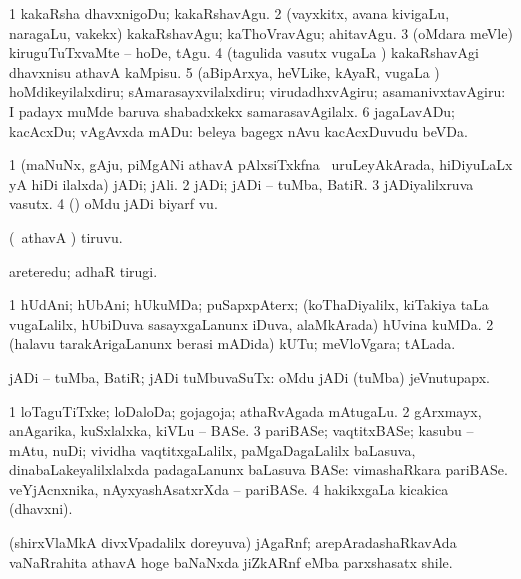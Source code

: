 \noindent
\gl{\akirx}
\bmng
\bnum
\num{1} kakaRsha dhavxnigoDu; kakaRshavAgu. 
\num{2} (vayxkitx, avana kivigaLu, naragaLu, \mo vakekx) kakaRshavAgu; kaThoVravAgu; ahitavAgu. 
\num{3} (oMdara meVle) kiruguTuTxvaMte -- hoDe, tAgu. 
\num{4} (tagulida vasutx \mo vugaLa \vi) kakaRshavAgi dhavxnisu athavA kaMpisu. 
\num{5} (aBipArxya, heVLike, kAyaR, \mo vugaLa \vi) hoMdikeyilalxdiru; sAmarasayxvilalxdiru; virudadhxvAgiru; asamanivxtavAgiru:  I padayx muMde baruva shabadxkekx samarasavAgilalx. 
\num{6} jagaLavADu; kacAcxDu; vAgAvxda mADu:  beleya bagegx nAvu kacAcxDuvudu beVDa. 
\enum
\emng
\eentry

\bentry
{}
\gl{\nA}
\bmng
\bnum
\num{1} (maNuNx, gAju, piMgANi athavA pAlxsiTxkfna \sA\ uruLeyAkArada, hiDiyuLaLx yA hiDi ilalxda) jADi; jAli. 
\num{2} jADi; jADi -- tuMba, BatiR. 
\num{3} jADiyalilxruva vasutx. 
\num{4} (\AmA) oMdu jADi biyarf \mo vu. 
\enum
\emng
\eentry

\bentry
{}
\gl{\nA}
\bmng
(\pArxparx\ athavA \AmA) tiruvu. 
\emng

\noindent
\gl{\pagu}
\bmng
{} areteredu; adhaR tirugi. 
\emng
\eentry

\bentry
{}
\gl{\nA}
\expl{\F}
\bmng
\bnum
\num{1} hUdAni; hUbAni; hUkuMDa; puSapxpAterx; (koThaDiyalilx, kiTakiya taLa \mo vugaLalilx, hUbiDuva sasayxgaLanunx iDuva, alaMkArada) hUvina kuMDa.   
\num{2} (halavu tarakArigaLanunx berasi mADida) kUTu; meVloVgara; tALada. 
\enum
\emng
\eentry

\bentry
{}
\gl{\gu}
\bmng
jADi -- tuMba, BatiR; jADi tuMbuvaSuTx:  oMdu jADi (tuMba) jeVnutupapx. 
\emng
\eentry

\bentry
{}
\gl{\nA}
\bmng
\bnum
\num{1} loTaguTiTxke; loDaloDa; gojagoja; athaRvAgada mAtugaLu. 
\num{2} gArxmayx, anAgarika, kuSxlalxka, kiVLu -- BASe. 
\num{3} pariBASe; vaqtitxBASe; kasubu -- mAtu, nuDi; vividha vaqtitxgaLalilx, paMgaDagaLalilx baLasuva, dinabaLakeyalilxlalxda padagaLanunx baLasuva BASe:  vimashaRkara pariBASe.  veYjAcnxnika, nAyxyashAsatxrXda -- pariBASe. 
\num{4} hakikxgaLa kicakica (dhavxni). 
\enum
\emng
\eentry

\bentry
{}
\gl{\nA}
\bmng
(shirxVlaMkA divxVpadalilx doreyuva) jAgaRnf; arepAradashaRkavAda vaNaRrahita athavA hoge baNaNxda jiZkARnf eMba parxshasatx shile. 
\emng
\eentry

